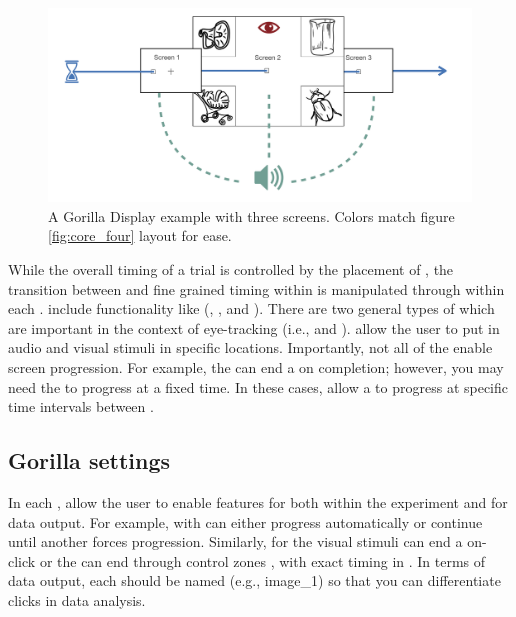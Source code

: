 \begin{figure}[h]
    \centering
    \includegraphics[scale=.5]{figures/Gorilla_work_flow.png}
    \caption{A Gorilla Display example with three screens. Colors match figure \ref{fig:core_four} layout for ease.}
    \label{fig:Gorilla_work_flow}
\end{figure}

While the overall timing of a trial is controlled by the placement of , the transition between  and fine grained timing within  is manipulated through  within each .  include functionality like (, , and ). There are two general types of  which are important in the context of eye-tracking (i.e.,  and ).   allow the user to put in audio and visual stimuli in specific locations. Importantly, not all of the   enable screen progression. For example, the   can end a  on completion; however, you may need the  to progress at a fixed time. In these cases,   allow a  to progress at specific time intervals between .  

\subsection{Gorilla settings}

In each ,  allow the user to enable features for both within the experiment and for data output. For example,  with  can either progress automatically or continue until another  forces progression. Similarly,  for the visual stimuli can end a  on-click or the  can end through control zones , with exact timing in . In terms of data output, each  should be named (e.g., image\_1) so that you can differentiate clicks in data analysis.

